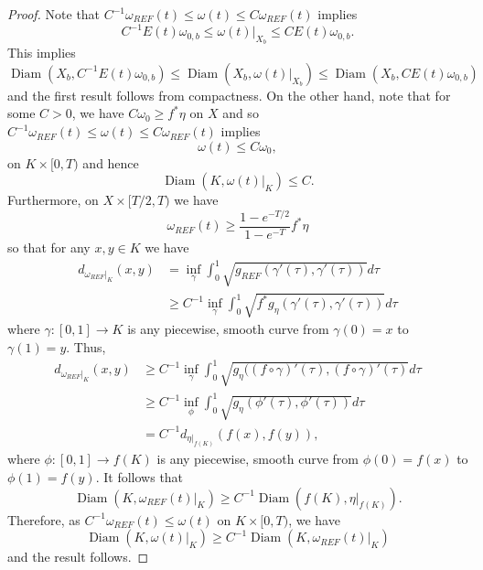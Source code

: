 \documentclass[12pt]{article}
\numberwithin{equation}{section}
\DeclareMathOperator{\Diam}{Diam}
\begin{document}
\begin{proof}
Note that $C^{-1}\omega_{REF}(t) \leq \omega(t) \leq C \omega_{REF}(t)$ implies
\begin{equation*}
    C^{-1} E(t) \omega_{0,b} \leq  \omega(t)|_{X_b} \leq C E(t) \omega_{0,b}.
\end{equation*}
This implies
\begin{equation*}
    \Diam(X_b, C^{-1}E(t)\omega_{0,b}) \leq \Diam(X_b, \omega(t)|_{X_b}) \leq \Diam(X_b, CE(t)\omega_{0,b})
\end{equation*}
and the first result follows from compactness. On the other hand, note that for some $C > 0$, we have $C\omega_0 \geq f^* \eta$ on $X$ and so $C^{-1} \omega_{REF}(t) \leq \omega(t) \leq C \omega_{REF}(t)$ implies
\begin{equation*}
    \omega(t) \leq C \omega_0,
\end{equation*}
on $K \times [0,T)$ and hence
\begin{equation*}
    \Diam(K,\omega(t)|_K) \leq C.
\end{equation*}
Furthermore, on $X \times [T/2,T)$ we have
\begin{equation*}
    \omega_{REF}(t) \geq \frac{1-e^{-T/2}}{1-e^{-T}} f^*\eta
\end{equation*}
so that for any $x,y \in K$ we have
\begin{align*}
d_{\omega_{REF}|_K}(x,y) &= \inf_{\gamma} \int_0^1 \sqrt{g_{REF}(\gamma'(\tau),\gamma'(\tau))} d \tau\\
&\geq {C}^{-1} \inf_{\gamma} \int_0^1 \sqrt{f^*g_{\eta}(\gamma'(\tau),\gamma'(\tau))} d \tau
\end{align*}
where $\gamma:[0,1] \to K$ is any piecewise, smooth curve from $\gamma(0) = x$ to $\gamma(1) = y$. Thus,
\begin{align*}
    d_{\omega_{REF}|_K}(x,y) &\geq C^{-1}\inf_{\gamma} \int_0^1 \sqrt{g_{\eta}((f \circ\gamma)'(\tau),(f\circ \gamma)'(\tau)} d \tau\\
    &\geq C^{-1}\inf_{\phi} \int_0^1 \sqrt{g_{\eta}(\phi'(\tau), \phi'(\tau))} d\tau\\
    &=C^{-1}d_{\eta|_{f(K)}}(f(x),f(y)),
\end{align*}
where $\phi:[0,1] \to f(K)$ is any piecewise, smooth curve from $\phi(0) = f(x)$ to $\phi(1) = f(y)$. It follows that
\begin{equation*}
    \Diam(K,\omega_{REF}(t)|_K) \geq C^{-1} \Diam(f(K),\eta|_{f(K)}).
\end{equation*}
Therefore, as $C^{-1}\omega_{REF}(t) \leq \omega(t)$ on $K \times [0,T)$, we have
\begin{equation*}
    \Diam(K,\omega(t)|_K) \geq C^{-1} \Diam(K,\omega_{REF}(t)|_{K})
\end{equation*}
and the result follows.
\end{proof}
\end{document}
